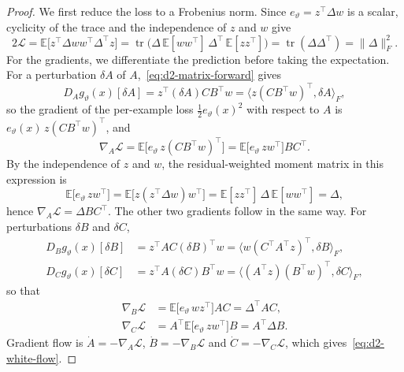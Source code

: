 \documentclass[11pt]{article}
\newcommand{\E}{\mathbb{E}}
\newcommand{\ip}[2]{\langle #1,#2\rangle}
\newcommand{\norm}[1]{\lVert #1\rVert}
\theoremstyle{definition}
\numberwithin{equation}{section}
\begin{document}
\begin{proof}
We first reduce the loss to a Frobenius norm. Since $e_\vartheta=z^\top\Delta w$ is a scalar, cyclicity of the trace and the independence of $z$ and $w$ give
\begin{equation}\label{eq:d2-white-loss-derivation}
2\mathcal L=\E\big[z^\top\Delta ww^\top\Delta^\top z\big]=\operatorname{tr}\big(\Delta\,\E[ww^\top]\,\Delta^\top\,\E[zz^\top]\big)=\operatorname{tr}(\Delta\Delta^\top)=\norm{\Delta}_F^2.
\end{equation}
For the gradients, we differentiate the prediction before taking the expectation. For a perturbation $\delta A$ of $A$,~\eqref{eq:d2-matrix-forward} gives
\begin{equation}\label{eq:d2-A-directional}
D_Ag_\vartheta(x)[\delta A]=z^\top(\delta A)CB^\top w=\ip{z(CB^\top w)^\top}{\delta A}_F,
\end{equation}
so the gradient of the per-example loss $\frac12e_\vartheta(x)^2$ with respect to $A$ is $e_\vartheta(x)\,z(CB^\top w)^\top$, and
\begin{equation}\label{eq:d2-A-gradient-residual}
\nabla_A\mathcal L=\E\big[e_\vartheta\,z(CB^\top w)^\top\big]=\E\big[e_\vartheta\,zw^\top\big]BC^\top.
\end{equation}
By the independence of $z$ and $w$, the residual-weighted moment matrix in this expression is
\begin{equation}\label{eq:d2-residual-white}
\E\big[e_\vartheta\,zw^\top\big]=\E\big[z(z^\top\Delta w)w^\top\big]=\E[zz^\top]\,\Delta\,\E[ww^\top]=\Delta,
\end{equation}
hence $\nabla_A\mathcal L=\Delta BC^\top$. The other two gradients follow in the same way. For perturbations $\delta B$ and $\delta C$,
\begin{align}
D_Bg_\vartheta(x)[\delta B]&=z^\top AC(\delta B)^\top w=\ip{w(C^\top A^\top z)^\top}{\delta B}_F,\label{eq:d2-B-directional}\\
D_Cg_\vartheta(x)[\delta C]&=z^\top A(\delta C)B^\top w=\ip{(A^\top z)(B^\top w)^\top}{\delta C}_F,\label{eq:d2-C-directional}
\end{align}
so that
\begin{align}
\nabla_B\mathcal L&=\E\big[e_\vartheta\,wz^\top\big]AC=\Delta^\top AC,\label{eq:d2-B-gradient}\\
\nabla_C\mathcal L&=A^\top\E\big[e_\vartheta\,zw^\top\big]B=A^\top\Delta B.\label{eq:d2-C-gradient}
\end{align}
Gradient flow is $\dot A=-\nabla_A\mathcal L$, $\dot B=-\nabla_B\mathcal L$ and $\dot C=-\nabla_C\mathcal L$, which gives~\eqref{eq:d2-white-flow}.
\end{proof}
\end{document}

